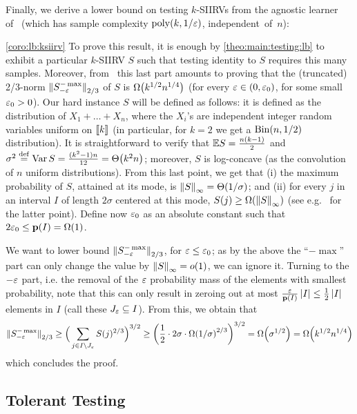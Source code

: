 \noindent Finally, we derive a lower bound on testing $k$-SIIRVs from the agnostic learner of~\cite{DDOST:13} (which has sample complexity $\operatorname*{poly}(k,1/\varepsilon)$, independent~of~$n$):
\corolbksiirv*
\begin{proofof}{\cref{coro:lb:ksiirv}}
To prove this result, it is enough by \cref{theo:main:testing:lb} to exhibit a particular $k$-SIIRV $S$ such that testing identity to $S$ requires this many samples. Moreover, from~\cite{VV:14} this last part amounts to proving that the (truncated) 2/3-norm $\lVert S^{-\max}_{-\varepsilon}{\rVert}_{2/3}$ of $S$ is $\bigOmega{k^{1/2}n^{1/4}}$ (for every $\varepsilon\in(0,\varepsilon_0)$, for some small $\varepsilon_0>0$). Our hard instance $S$ will be defined as follows: it is defined as the distribution of $X_1+\dots+X_n$, where the $X_i$'s are independent integer random variables uniform on $\llbracket k\rrbracket$ (in particular, for $k=2$ we get a $\operatorname{Bin}\!\left( n, 1/2 \right)$ distribution). It is straightforward to verify that $\mathbb{E}{S} = \frac{n(k-1)}{2}$ and $\sigma^2\eqdef\var S = \frac{(k^2-1)n}{12} = \bigTheta{k^2 n}$; moreover, $S$ is log-concave (as the convolution of $n$ uniform distributions). From this last point, we get that \textsf{(i)} the maximum probability of $S$, attained at its mode, is $\norminf{S}=\bigTheta{1/\sigma}$; and \textsf{(ii)} for every $j$ in an interval $I$ of length $2\sigma$ centered at this mode, $S(j) \geq \bigOmega{\norminf{S}}$ (see e.g.~\cite[Lemma 5.7]{DKS:15:arXiv} for the latter point). Define now $\varepsilon_0$ as an absolute constant such that  $2\eps_0 \leq \D(I) = \bigOmega{1}$.

We want to lower bound $\lVert S^{-\max}_{-\varepsilon}{\rVert}_{2/3}$, for $\varepsilon\leq \varepsilon_0$; as by the above the ``$-\max$'' part can only change the value by ${\lVert S{\rVert}}_\infty=o(1)$, we can ignore it. Turning to the $-\varepsilon$ part, i.e. the removal of the $\varepsilon$ probability mass of the elements with smallest probability, note that this can only result in zeroing out at most $\frac{\varepsilon}{\mathbf{p}(I)}\left\lvert I \right\rvert\leq \frac{1}{2}\left\lvert I \right\rvert$ elements in $I$ (call these $J_\varepsilon\subseteq I$). From this, we obtain that
\[
    \norm{S^{-\max}_{-\eps}}_{2/3}\geq \Big(\sum_{j\in I\setminus J_\eps} S(j)^{2/3}\Big)^{3/2} \geq \mleft(\frac{1}{2}\cdot 2\sigma\cdot \bigOmega{1/\sigma}^{2/3}\mright)^{3/2} =\bigOmega{\sigma^{1/2}} = \bigOmega{k^{1/2}n^{1/4}}
\]
which concludes the proof.
\end{proofof}

\subsection{Tolerant Testing}\label{sec:lowerbounds:tol}

